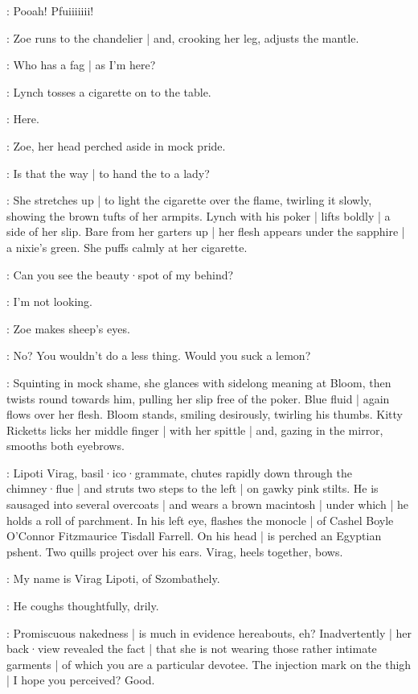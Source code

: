 \Gasjet:
Pooah!
Pfuiiiiiii!

:
Zoe runs to the chandelier |
and,
crooking her leg,
adjusts the mantle.

\Zoe:
Who has a fag |
as I'm here?

:
Lynch tosses a cigarette on to the table.

\Lynch:
Here.

:
Zoe,
her head perched aside in mock pride.

\Zoe:
Is that the way |
to hand the  to a lady?

:
She stretches up |
to light the cigarette over the flame,
twirling it slowly,
showing the brown tufts of her armpits.
Lynch with his poker |
lifts boldly |
a side of her slip.
Bare from her garters up |
her flesh appears under the sapphire |
a nixie's green.
She puffs calmly at her cigarette.

\Zoe:
Can you see the beauty·spot of my behind?

\Lynch:
I'm not looking.

:
Zoe makes sheep's eyes.

\Zoe:
No?
You wouldn't do a less thing.
Would you suck a lemon?

:
Squinting in mock shame,
she glances with sidelong meaning at Bloom,
then twists round towards him,
pulling her slip free of the poker.
Blue fluid |
again flows over her flesh.
Bloom stands,
smiling desirously,
twirling his thumbs.
Kitty Ricketts licks her middle finger |
with her spittle |
and,
gazing in the mirror,
smooths both eyebrows.

:
Lipoti Virag,
basil·ico·grammate,
chutes rapidly down through the chimney·flue |
and struts two steps to the left |
on gawky pink stilts.
He is sausaged into several overcoats |
and wears a brown macintosh |
under which |
he holds a roll of parchment.
In his left eye,
flashes the monocle |
of Cashel Boyle O'Connor Fitzmaurice Tisdall Farrell.
On his head |
is perched an Egyptian pshent.
Two quills project over his ears.%
Virag,
heels together,
bows.

\Virag:
My name is Virag Lipoti,
of Szombathely.

:
He coughs thoughtfully,
drily.

\Virag:
Promiscuous nakedness |
is much in evidence hereabouts,
eh?
Inadvertently |
her back·view revealed the fact |
that she is not wearing those rather intimate garments |
of which you are a particular devotee.
The injection mark on the thigh |
I hope you perceived?
Good.

